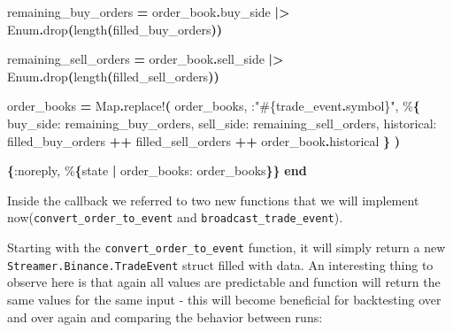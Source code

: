 \documentclass[
  oneside]{book}
\newenvironment{Shaded}{\begin{snugshade}}{\end{snugshade}}
\newcommand{\ConstantTok}[1]{\textcolor[rgb]{0.56,0.35,0.01}{#1}}
\newcommand{\FunctionTok}[1]{\textcolor[rgb]{0.13,0.29,0.53}{\textbf{#1}}}
\newcommand{\KeywordTok}[1]{\textcolor[rgb]{0.13,0.29,0.53}{\textbf{#1}}}
\newcommand{\NormalTok}[1]{#1}
\newcommand{\OperatorTok}[1]{\textcolor[rgb]{0.81,0.36,0.00}{\textbf{#1}}}
\newcommand{\OtherTok}[1]{\textcolor[rgb]{0.56,0.35,0.01}{#1}}
\newcommand{\StringTok}[1]{\textcolor[rgb]{0.31,0.60,0.02}{#1}}
\newcommand{\VariableTok}[1]{\textcolor[rgb]{0.00,0.00,0.00}{#1}}
\begin{document}
\begin{Shaded}
\begin{Highlighting}[]
\NormalTok{    remaining\_buy\_orders }\OperatorTok{=}
\NormalTok{      order\_book}\OperatorTok{.}\NormalTok{buy\_side}
      \OperatorTok{|\textgreater{}} \ConstantTok{Enum}\OperatorTok{.}\NormalTok{drop}\FunctionTok{(}\NormalTok{length}\FunctionTok{(}\NormalTok{filled\_buy\_orders}\FunctionTok{))}

\NormalTok{    remaining\_sell\_orders }\OperatorTok{=}
\NormalTok{      order\_book}\OperatorTok{.}\NormalTok{sell\_side}
      \OperatorTok{|\textgreater{}} \ConstantTok{Enum}\OperatorTok{.}\NormalTok{drop}\FunctionTok{(}\NormalTok{length}\FunctionTok{(}\NormalTok{filled\_sell\_orders}\FunctionTok{))}

\NormalTok{    order\_books }\OperatorTok{=}
      \ConstantTok{Map}\OperatorTok{.}\NormalTok{replace!}\FunctionTok{(}
\NormalTok{        order\_books,}
\NormalTok{        :}\StringTok{"}\OtherTok{\#\{}\NormalTok{trade\_event}\OperatorTok{.}\NormalTok{symbol}\OtherTok{\}}\StringTok{"}\NormalTok{,}
\NormalTok{        \%}\FunctionTok{\{}
          \VariableTok{buy\_side:}\NormalTok{ remaining\_buy\_orders,}
          \VariableTok{sell\_side:}\NormalTok{ remaining\_sell\_orders,}
          \VariableTok{historical:}
\NormalTok{            filled\_buy\_orders }\OperatorTok{++}
\NormalTok{              filled\_sell\_orders }\OperatorTok{++}
\NormalTok{              order\_book}\OperatorTok{.}\NormalTok{historical}
        \FunctionTok{\}}
      \FunctionTok{)}

    \FunctionTok{\{}\VariableTok{:noreply}\NormalTok{, \%}\FunctionTok{\{}\NormalTok{state }\OperatorTok{|} \VariableTok{order\_books:}\NormalTok{ order\_books}\FunctionTok{\}\}}
  \KeywordTok{end}
\end{Highlighting}
\end{Shaded}

Inside the callback we referred to two new functions that we will implement now(\texttt{convert\_order\_to\_event} and \texttt{broadcast\_trade\_event}).

Starting with the \texttt{convert\_order\_to\_event} function, it will simply return a new \texttt{Streamer.Binance.TradeEvent} struct filled with data. An interesting thing to observe here is that again all values are predictable and function will return the same values for the same input - this will become beneficial for backtesting over and over again and comparing the behavior between runs:
\end{document}
